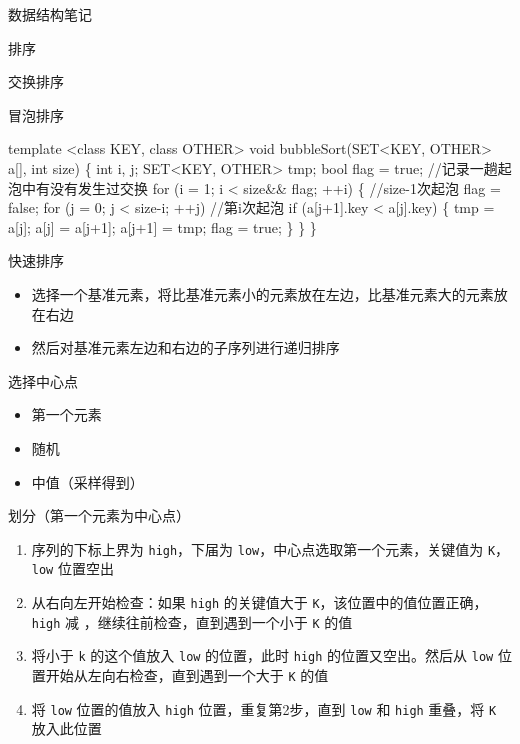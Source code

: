 \documentclass[
  ignorenonframetext,
]{beamer}
\newenvironment{Shaded}{}{}
\newcommand{\NormalTok}[1]{#1}
\providecommand{\tightlist}{%
  \setlength{\itemsep}{0pt}\setlength{\parskip}{0pt}}
\begin{document}
\begin{frame}[fragile]{数据结构笔记}
\begin{block}{排序}
\begin{block}{交换排序}
\begin{block}{冒泡排序}
\begin{Shaded}
\begin{Highlighting}[]
\NormalTok{template \textless{}class KEY, class OTHER\textgreater{}}
\NormalTok{void bubbleSort(SET\textless{}KEY, OTHER\textgreater{} a[], int size)}
\NormalTok{\{}
\NormalTok{  int i, j;}
\NormalTok{  SET\textless{}KEY, OTHER\textgreater{} tmp;}
\NormalTok{  bool flag = true; //记录一趟起泡中有没有发生过交换}
\NormalTok{  for (i = 1; i \textless{} size\&\& flag; ++i)}
\NormalTok{  \{ //size{-}1次起泡}
\NormalTok{    flag = false;}
\NormalTok{    for (j = 0; j \textless{} size{-}i; ++j) //第i次起泡}
\NormalTok{    if (a[j+1].key \textless{} a[j].key)}
\NormalTok{    \{}
\NormalTok{      tmp = a[j]; a[j] = a[j+1]; a[j+1] = tmp;}
\NormalTok{      flag = true;}
\NormalTok{    \}}
\NormalTok{  \}}
\NormalTok{\}}
\end{Highlighting}
\end{Shaded}
\end{block}

\begin{block}{快速排序}
\protect{}\label{ux5febux901fux6392ux5e8f}
\begin{itemize}
\tightlist
\item
  选择一个基准元素，将比基准元素小的元素放在左边，比基准元素大的元素放在右边
\item
  然后对基准元素左边和右边的子序列进行递归排序
\end{itemize}

\begin{block}{选择中心点}
\protect{}\label{ux9009ux62e9ux4e2dux5fc3ux70b9}
\begin{itemize}
\tightlist
\item
  第一个元素
\item
  随机
\item
  中值（采样得到）
\end{itemize}
\end{block}

\begin{block}{划分（第一个元素为中心点）}
\protect{}\label{ux5212ux5206ux7b2cux4e00ux4e2aux5143ux7d20ux4e3aux4e2dux5fc3ux70b9}
\begin{enumerate}
\tightlist
\item
  序列的下标上界为 \texttt{high}，下届为
  \texttt{low}，中心点选取第一个元素，关键值为 \texttt{K}，\texttt{low}
  位置空出
\item
  从右向左开始检查：如果 \texttt{high} 的关键值大于
  \texttt{K}，该位置中的值位置正确，\texttt{high} 减
  {}，继续往前检查，直到遇到一个小于 \texttt{K} 的值
\item
  将小于 \texttt{k} 的这个值放入 \texttt{low} 的位置，此时 \texttt{high}
  的位置又空出。然后从 \texttt{low}
  位置开始从左向右检查，直到遇到一个大于 \texttt{K} 的值
\item
  将 \texttt{low} 位置的值放入 \texttt{high} 位置，重复第2步，直到
  \texttt{low} 和 \texttt{high} 重叠，将 \texttt{K} 放入此位置
\end{enumerate}


\end{block}
\end{block}
\end{block}
\end{block}
\end{frame}
\end{document}
